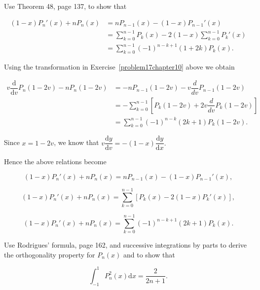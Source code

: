 \begin{problem}\label{problem18chapter10}
Use Theorem 48, page 137, to show that

$$\begin{array}{ll}
(1-x)P_n'(x) + nP_n(x) &= nP_{n-1}(x) - (1-x)P_{n-1}'(x) \\
&= \displaystyle\sum_{k=0}^{n-1} P_k(x) - 2(1-x) \displaystyle\sum_{k=0}^{n-1} P_k'(x) \\
&= \displaystyle\sum_{k=0}^{n-1} (-1)^{n-k+1} (1+2k)P_k(x).
\end{array}$$
\end{problem}
\begin{solution}
Using the transformation in Exercise~\ref{problem17chapter10} above we obtain

$$\begin{array}{ll}
v \dfrac{\mathrm{d}}{\mathrm{d}v} P_n(1-2v) - nP_n(1-2v) &= -nP_{n-1}(1-2v) - v \dfrac{d}{dv} P_{n-1}(1-2v) \\
&= - \displaystyle\sum_{k=0}^{n-1} [P_k(1-2v) + 2v \dfrac{d}{dv} P_k(1-2v)] \\
&= \displaystyle\sum_{k=0}^{n-1} (-1)^{n-k} (2k+1) P_k(1-2v).
\end{array}$$

Since $x = 1-2v$, we know that $v \dfrac{\mathrm{d}y}{\mathrm{d}v} = -(1-x) \dfrac{\mathrm{d}y}{\mathrm{d}x}.$

Hence the above relations become

$$(1-x)P_n'(x) + nP_n(x) = nP_{n-1}(x) - (1-x)P_{n-1}'(x),$$

$$(1-x) P_n'(x) + nP_n(x) = \displaystyle\sum_{k=0}^{n-1} [P_k(x) - 2(1-x) P_k'(x)],$$

$$(1-x)P_n'(x) + nP_n(x) = \displaystyle\sum_{k=0}^{n-1} (-1)^{n-k+1} (2k+1) P_k(x).$$
\end{solution}
\begin{problem}\label{problem19chapter10}
Use Rodrigues' formula, page 162, and successive integrations by parts to derive the orthogonality property for $P_n(x)$ and to show that 

$$\displaystyle\int_{-1}^1 P_n^2(x) \mathrm{d}x = \dfrac{2}{2n+1}.$$
\end{problem}
